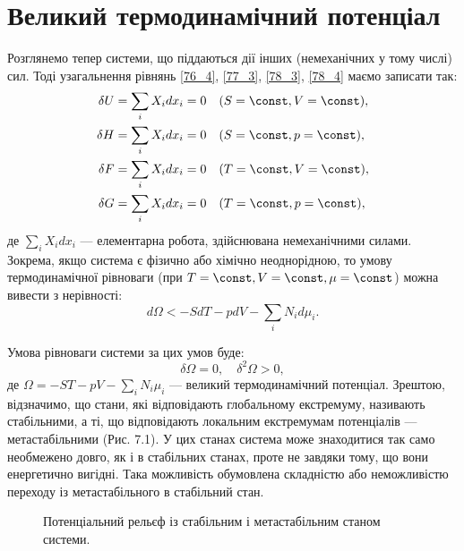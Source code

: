 \section{Великий термодинамічний потенціал}

Розглянемо тепер системи, що піддаються дії інших (немеханічних у тому числі) сил. Тоді узагальнення рівнянь \eqref{76_4}, \eqref{77_3}, \eqref{78_3}, \eqref{78_4} маємо записати так:
%
\begin{align}
\delta U &= \sum_i X_i dx_i = 0 \quad (S = \const, V = \const), \label{79_1} \\
\delta H &= \sum_i X_i dx_i = 0 \quad (S = \const, p = \const), \label{79_2} \\
\delta F &= \sum_i X_i dx_i = 0 \quad (T = \const, V = \const), \label{79_3} \\
\delta G &= \sum_i X_i dx_i = 0 \quad (T = \const, p = \const), \label{79_4}
\end{align}
%
де $\sum_i X_i dx_i$ --- елементарна робота, здійснювана немеханічними силами. Зокрема, якщо система є фізично або хімічно неоднорідною, то умову термодинамічної рівноваги (при $T = \const, V = \const, \mu = \const$) можна вивести з нерівності:
\begin{equation} \label{79_5}
d\Omega < -S dT - p dV - \sum_i N_i d\mu_i.
\end{equation}

Умова рівноваги системи за цих умов буде:
\begin{equation} \label{79_6}
\delta \Omega = 0, \quad \delta^2 \Omega > 0,
\end{equation}
%
де $\Omega = -ST - pV - \sum_i N_i \mu_i$ --- великий термодинамічний потенціал. Зрештою, відзначимо, що стани, які відповідають глобальному екстремуму, називають стабільними, а ті, що відповідають локальним екстремумам потенціалів --- метастабільними (Рис. 7.1). У цих станах система може знаходитися так само необмежено довго, як і в стабільних станах, проте не завдяки тому, що вони енергетично вигідні. Така можливість обумовлена складністю або неможливістю переходу із метастабільного в стабільний стан.

\begin{figure}[h]
\centering

\caption{Потенціальний рельєф із стабільним і метастабільним станом системи.}
\label{pic:state}
\end{figure}

